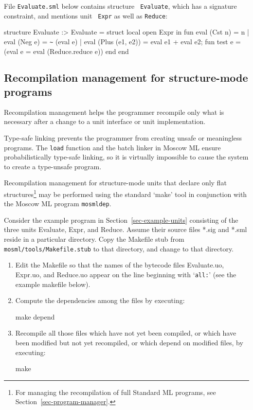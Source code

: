 \documentclass[fleqn]{article}
\begin{document}
\noindent File {\tt Evaluate.sml} below contains structure {\tt
  Evaluate}, which has a signature constraint, and mentions unit {\tt
  Expr} as well as {\tt Reduce}:

\begin{program}
structure Evaluate :> Evaluate = struct 
    local open Expr 
    in 
        fun eval (Cst n)         = n
          | eval (Neg e)         = \verb#~# (eval e)
          | eval (Plus (e1, e2)) = eval e1 + eval e2;
        fun test e = (eval e = eval (Reduce.reduce e))
    end
end
\end{program}


\subsection{Recompilation management for structure-mode programs}
\label{sec-structure-mode-recompilation}

Recompilation management helps the programmer recompile only what is
necessary after a change to a unit interface or unit implementation.  

Type-safe linking prevents the programmer from creating unsafe or
meaningless programs.  The {\tt load} function and the batch linker in
Moscow ML ensure probabilistically type-safe linking, so it is
virtually impossible to cause the system to create a type-unsafe
program.

Recompilation management for structure-mode units that declare only
flat structures\footnote{For managing the recompilation of full
  Standard ML programs, see Section~\ref{sec-program-manager}.} may be
performed using the standard `make' tool in conjunction with the
Moscow ML program \texttt{mosmldep}.

Consider the example program in Section~\ref{sec-example-units}
consisting of the three units Evaluate, Expr, and Reduce.  Assume
their source files *.sig and *.sml reside in a particular directory.
Copy the Makefile stub from \texttt{mosml/tools/Makefile.stub} to that
directory, and change to that directory.

\begin{enumerate}
\item Edit the Makefile so that the names of the bytecode files
  Evaluate.uo, Expr.uo, and Reduce.uo appear on the line beginning
  with `{\tt all:}' (see the example makefile below).

\item Compute the dependencies among the files by executing:
\begin{program}
make depend
\end{program}

\item Recompile all those files which have not yet been compiled, or
  which have been modified but not yet recompiled, or which depend on
  modified files, by executing:
        
\begin{program}
make    
\end{program}
\end{enumerate}
\end{document}
